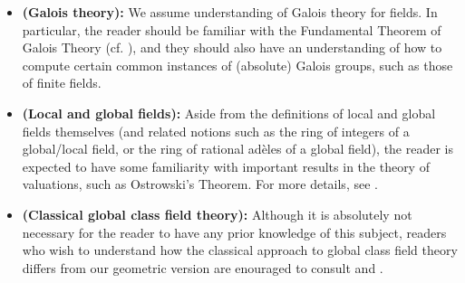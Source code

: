         \begin{convention} \label{conv: number_theory}
            \noindent
            \begin{itemize}
                \item \textbf{(Galois theory):} We assume understanding of Galois theory for fields. In particular, the reader should be familiar with the Fundamental Theorem of Galois Theory (cf. \cite[\href{https://stacks.math.columbia.edu/tag/0BML}{Tag 0BML}]{stacks}), and they should also have an understanding of how to compute certain common instances of (absolute) Galois groups, such as those of finite fields.
                \item \textbf{(Local and global fields):} Aside from the definitions of local and global fields themselves (and related notions such as the ring of integers of a global/local field, or the ring of rational ad\`eles of a global field), the reader is expected to have some familiarity with important results in the theory of valuations, such as Ostrowski's Theorem. For more details, see \cite[Chapter II]{neukirch_2010_algebraic_number_theory}.
                \item \textbf{(Classical global class field theory):} Although it is absolutely not necessary for the reader to have any prior knowledge of this subject, readers who wish to understand how the classical approach to global class field theory differs from our geometric version are enouraged to consult \cite[Chapters IV and VI]{neukirch_2010_algebraic_number_theory} and \cite[Chapters III, VIII, and IX]{neukirch_1999_cohomology_of_number_field}.
            \end{itemize}
        \end{convention}